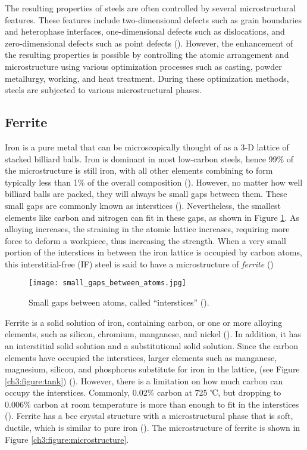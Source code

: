 The resulting properties of steels are often controlled by several microstructural features. These features include two-dimensional defects such as grain boundaries and heterophase interfaces, one-dimensional defects such as dislocations, and zero-dimensional defects such as point defects (\cite{clemens2017microstructure}). However, the enhancement of the resulting properties is possible by controlling the atomic arrangement and microstructure using various optimization processes such as casting, powder metallurgy, working, and heat treatment. During these optimization methods, steels are subjected to various microstructural phases.

\subsection{Ferrite} 
Iron is a pure metal that can be microscopically thought of as a 3-D lattice of stacked billiard balls. Iron is dominant in most low-carbon steels, hence 99\% of the microstructure is still iron, with all other elements combining to form typically less than 1\% of the overall composition (\cite{bajaj2020steels}). However, no matter how well billiard balls are packed, they will always be small gaps between them. These small gaps are commonly known as interstices (\cite{bajaj2020steels}). Nevertheless, the smallest elements like carbon and nitrogen can fit in these gaps, as shown in Figure \ref{ch3:figure:gaps}. As alloying increases, the straining in the atomic lattice increases, requiring more force to deform a workpiece, thus increasing the strength. When a very small portion of the interstices in between the iron lattice is occupied by carbon atoms, this interstitial-free (IF) steel is said to have a microstructure of \emph{ferrite} (\cite{bhadeshia2017steels})
 
\begin{figure}[H]
    \centering
    \texttt{[image: small\_gaps\_between\_atoms.jpg]}
    \caption{Small gaps between atoms, called “interstices” (\cite{bajaj2020steels}).}
    \label{ch3:figure:gaps}
\end{figure}

Ferrite is a solid solution of iron, containing carbon, or one or more alloying elements, such as silicon, chromium, manganese, and nickel (\cite{molabe2018determining}). In addition, it has an interstitial solid solution and a substitutional solid solution. Since the carbon elements have occupied the interstices, larger elements such as manganese, magnesium, silicon, and phosphorus substitute for iron in the lattice, (see Figure \ref{ch3:figure:tank}) (\cite{jones2012engineering}). However, there is a limitation on how much carbon can occupy the interstices. Commonly, 0.02\% carbon at 725 ℃, but dropping to 0.006\% carbon at room temperature is more than enough to fit in the interstices (\cite{bhadeshia2017steels}). Ferrite has a bcc crystal structure with a microstructural phase that is soft, ductile, which is similar to pure iron (\cite{bajaj2020steels}). The microstructure of ferrite is shown in Figure \ref{ch3:figure:microstructure}.

